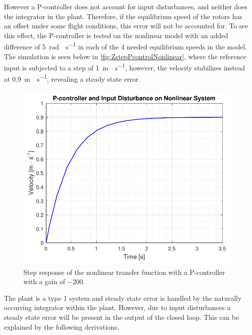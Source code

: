However a P-controller does not account for input disturbances, and neither does the integrator in the plant. Therefore, if the equilibrium speed of the rotors has an offset under some flight conditions, this error will not be accounted for.
To see this effect, the P-controller is tested on the nonlinear model with an added difference of \SI{5}{rad \cdot s^{-1}} in each of the 4 needed equilibrium speeds in the model. The simulation is seen below in \autoref{fig:ZstepPcontrolNonlinear}, where the reference input is subjected to a step of \SI{1}{m \cdot s^{-1}}, however, the velocity stabilizes instead at \SI{0.9}{m \cdot s^{-1}}, revealing a steady state error.

\begin{figure}[H]
	\centering
	\includegraphics[width=.6\textwidth]{figures/ZstepPcontrolNonlinear.pdf}
	\caption{Step response of the nonlinear transfer function with a P-controller with a gain of $-200$.}
	\label{fig:ZstepPcontrolNonlinear}
\end{figure}
%

The plant is a type 1 system and steady state error is handled by the naturally occurring integrator within the plant. However, due to input disturbances a steady state error will be present in the output of the closed loop. This can be explained by the following derivations.   

